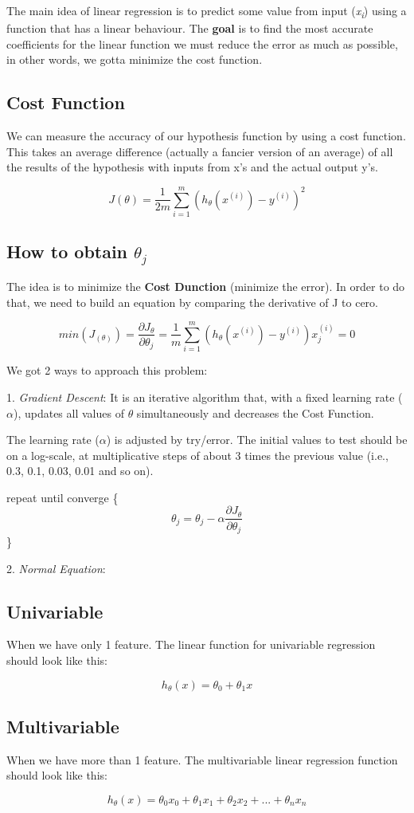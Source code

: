 The main idea of linear regression is to predict some value from input (\textit{x\textsubscript{i}}) using a function that has a linear behaviour. The \textbf{goal} is to find the most accurate coefficients for the linear function we must reduce the error as much as possible, in other words, we gotta minimize the cost function.

\subsection{Cost Function}
We can measure the accuracy of our hypothesis function by using a cost function. This takes an average difference (actually a fancier version of an average) of all the results of the hypothesis with inputs from x's and the actual output y's.

$$J(\theta) = \frac{1}{2m}\sum_{i=1}^{m} (h_{\theta}(x^{(i)}) - y^{(i)})^2$$

\subsection{How to obtain $\theta_{j}$}
The idea is to minimize the \textbf{Cost Dunction} (minimize the error). In order to do that, we need to build an equation by comparing the derivative of J to cero.

$$min(J_{(\theta)}) = \frac{\partial{J_{\theta}}}{\partial{\theta_{j}}} = \frac{1}{m}\sum_{i=1}^{m} (h_{\theta}(x^{(i)}) - y^{(i)})x_{j}^{(i)} = 0$$

We got 2 ways to approach this problem:

1. \textit{Gradient Descent}: It is an iterative algorithm that, with a fixed learning rate ($\alpha$), updates all values of $\theta$ simultaneously and decreases the Cost Function.

The learning rate ($\alpha$) is adjusted by try/error. The initial values to test should be on a log-scale, at multiplicative
steps of about 3 times the previous value (i.e., 0.3, 0.1, 0.03, 0.01 and so on).
\par
\begin{center}
repeat until converge \{
	$$\theta_{j} = \theta_{j} - \alpha \frac{\partial{J_{\theta}}}{\partial{\theta_{j}}}$$
\}
\end{center}

2. \textit{Normal Equation}: 



\subsection{Univariable}
When we have only 1 feature. The linear function for univariable regression should look like this:

$$h_{\theta}(x) = \theta_{0} + \theta_{1}x$$

\subsection{Multivariable}
When we have more than 1 feature. The multivariable linear regression function should look like this:

$$h_{\theta}(x) = \theta_{0}x_{0} + \theta_{1}x_{1} + \theta_{2}x_{2} + ... + \theta_{n}x_{n}$$

